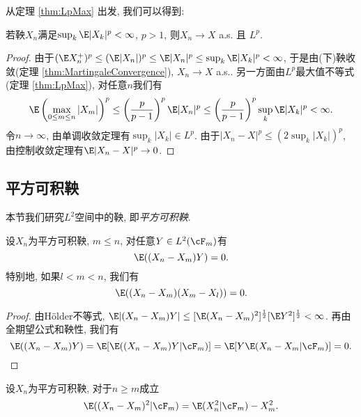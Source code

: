 \documentclass[a4paper, 10pt]{ctexart}
\begin{document}
从定理 \ref{thm:LpMax} 出发, 我们可以得到: 
\begin{theorem}[鞅的$L^p$收敛定理]\label{thm:LpConvergence}
	若鞅$X_n$满足$\sup_k \E |X_k|^p < \infty$, $p > 1$, 则$X_n \to X$ a.s. 且 $L^p$. 
\end{theorem}
\begin{proof}
	由于$(\E X_n^+)^p \leq (\E|X_n|)^p \leq \E |X_n|^p \leq \sup_k \E |X_k|^p < \infty$, 于是由(下)鞅收敛(定理 \ref{thm:MartingaleConvergence}), $X_n \to X$ a.s.. 
	另一方面由$L^p$最大值不等式(定理 \ref{thm:LpMax}), 对任意$n$我们有
	\begin{equation*}
		\E \left( \max_{0 \leq m \leq n} |X_m| \right)^p 
		\leq 
		\left( \frac{p}{p-1} \right)^p \E|X_n|^p 
		\leq  
		\left( \frac{p}{p-1} \right)^p \sup_k \E|X_k|^p
		< \infty. 
	\end{equation*}
	令$n \to \infty$, 由单调收敛定理有$\sup_k |X_k| \in L^p$. 
	由于$|X_n - X|^p \leq (2 \sup_k |X_k|)^p$, 由控制收敛定理有$\E |X_n - X|^p \to 0$. 
\end{proof}

\subsection{平方可积鞅}

\noindent
本节我们研究$L^2$空间中的鞅, 即\emph{平方可积鞅}. 

\begin{theorem}[鞅增量的正交性]
	设$X_n$为平方可积鞅, $m \leq n$, 对任意$Y \in L^2(\cF_m)$有
	\begin{equation*}
		\E((X_n - X_m) Y) = 0. 
	\end{equation*}
	特别地, 如果$l < m < n$, 我们有
	\begin{equation*}
		\E((X_n - X_m)(X_m -X_l)) = 0. 
	\end{equation*}
\end{theorem}
\begin{proof}
	由Hölder不等式, $\E|(X_n - X_m) Y| \leq [\E(X_n - X_m)^2] ^{\frac12} [\E Y^2] ^{\frac12} < \infty$. 
	再由全期望公式和鞅性, 我们有
	\begin{equation*}
		\E((X_n - X_m) Y) = \E[\E((X_n - X_m) Y | \cF_m)] = \E[ Y \E(X_n - X_m | \cF_m)] = 0. 
	\end{equation*}
\end{proof}

\begin{theorem}[条件方差公式]
	设$X_n$为平方可积鞅, 对于$n \geq m$成立
	\begin{equation*}
		\E((X_n - X_m)^2 | \cF_m) = \E(X_n^2 |\cF_m) - X_m^2. 
	\end{equation*}
\end{theorem}
\end{document}
